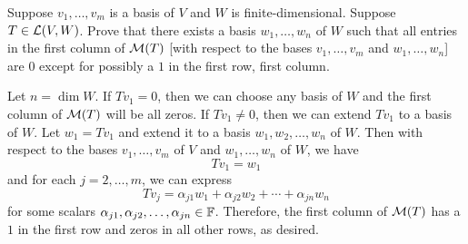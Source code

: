 \begin{exercise}
Suppose $v_1,\dots,v_m$ is a basis of $V$ and $W$ is finite-dimensional.
Suppose $T\in\mathcal{L}(V,W)$. Prove that there exists a basis $w_1,\dots,w_n$ of $W$
such that all entries in the first column of $\mathcal{M}(T)$ [with respect to the
bases $v_1,\dots,v_m$ and $w_1,\dots,w_n$] are $0$ except for possibly a $1$ in
the first row, first column.
\end{exercise}
\begin{solution}
Let $n=\dim W$. If $Tv_1=0$, then we can choose any basis of $W$ and the first
column of $\mathcal{M}(T)$ will be all zeros. If $Tv_1\ne0$, then we can extend $Tv_1$
to a basis of $W$. Let $w_1=Tv_1$ and extend it to a basis
$w_1,w_2,\dots,w_n$ of $W$. Then with respect to the bases $v_1,\dots,v_m$ of
$V$ and $w_1,\dots,w_n$ of $W$, we have
\[ Tv_1 = w_1 \]
and for each $j=2,\dots,m$, we can express
\[ Tv_j = \alpha_{j1}w_1+\alpha_{j2}w_2+\cdots+\alpha_{jn}w_n \]
for some scalars $\alpha_{j1},\alpha_{j2},\dots,\alpha_{jn}\in\mathbb{F}$. Therefore,
the first column of $\mathcal{M}(T)$ has a $1$ in the first row and zeros in all other
rows, as desired.
\end{solution}

